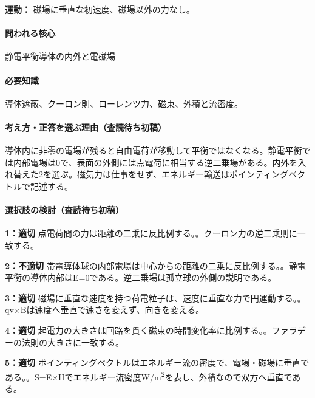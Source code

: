 \noindent\textbf{運動：} 磁場に垂直な初速度、磁場以外の力なし。\par

\paragraph{問われる核心} 静電平衡導体の内外と電磁場

\paragraph{必要知識} 導体遮蔽、クーロン則、ローレンツ力、磁束、外積と流密度。

\paragraph{考え方・正答を選ぶ理由（査読待ち初稿）} 導体内に非零の電場が残ると自由電荷が移動して平衡ではなくなる。静電平衡では内部電場は0で、表面の外側には点電荷に相当する逆二乗場がある。内外を入れ替えた2を選ぶ。磁気力は仕事をせず、エネルギー輸送はポインティングベクトルで記述する。

\paragraph{選択肢の検討（査読待ち初稿）}\mbox{}\par

\noindent\textbf{1：適切} 点電荷間の力は距離の二乗に反比例する。。クーロン力の逆二乗則に一致する。\par

\noindent\textbf{2：不適切} 帯電導体球の内部電場は中心からの距離の二乗に反比例する。。静電平衡の導体内部はE=\allowbreak{}0である。逆二乗場は孤立球の外側の説明である。\par

\noindent\textbf{3：適切} 磁場に垂直な速度を持つ荷電粒子は、速度に垂直な力で円運動する。。qv×Bは速度へ垂直で速さを変えず、向きを変える。\par

\noindent\textbf{4：適切} 起電力の大きさは回路を貫く磁束の時間変化率に比例する。。ファラデーの法則の大きさに一致する。\par

\noindent\textbf{5：適切} ポインティングベクトルはエネルギー流の密度で、電場・磁場に垂直である。。S=\allowbreak{}E×Hでエネルギー流密度W/m\textsuperscript{2}を表し、外積なので双方へ垂直である。\par

